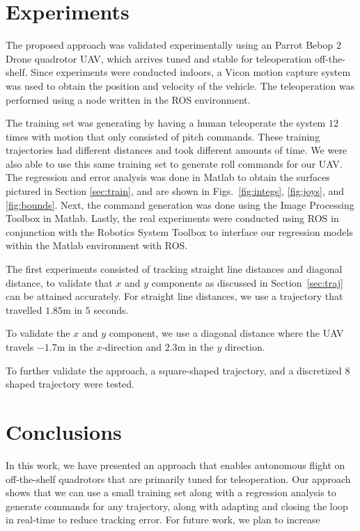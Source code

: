 \documentclass[letterpaper, 10 pt, conference]{ieeeconf}  %
\begin{document}
\section{Experiments} \label{sec:exper}

The proposed approach was validated experimentally using an Parrot Bebop 2 Drone quadrotor UAV, which arrives tuned and stable for teleoperation off-the-shelf. Since experiments were conducted indoors, a Vicon motion capture system was used to obtain the position and velocity of the vehicle. The teleoperation was performed using a node written in the ROS environment.

The training set was generating by having a human teleoperate the system $12$ times with motion that only consisted of pitch commands. These training trajectories had different distances and took different amounts of time. We were also able to use this same training set to generate roll commands for our UAV. The regression and error analysis was done in Matlab to obtain the surfaces pictured in Section \ref{sec:train}, and are shown in Figs.~\ref{fig:integs}, \ref{fig:joys}, and \ref{fig:bounds}. Next, the command generation was done using the Image Processing Toolbox in Matlab. Lastly, the real experiments were conducted using ROS in conjunction with the Robotics System Toolbox to interface our regression models within the Matlab environment with ROS.

The first experiments consisted of tracking straight line distances and diagonal distance, to validate that $x$ and $y$ components as discussed in Section~\ref{sec:traj} can be attained accurately. For straight line distances, we use a trajectory that travelled $1.85$m in $5$ seconds.

To validate the $x$ and $y$ component, we use a diagonal distance where the UAV travels $-1.7$m in the $x$-direction and $2.3$m in the $y$ direction.

To further validate the approach, a square-shaped trajectory, and a discretized $8$ shaped trajectory were tested. 




\section{Conclusions} \label{sec:conc}
In this work, we have presented an approach that enables autonomous flight on off-the-shelf quadrotors that are primarily tuned for teleoperation. Our approach shows that we can use a small training set along with a regression analysis to generate commands for any trajectory, along with adapting and closing the loop in real-time to reduce tracking error. For future work, we plan to increase 
\end{document}
